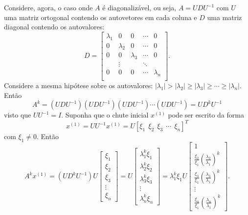 Considere, agora, o caso onde $A$ é diagonalizável, ou seja, $A=U D U^{-1}$ com $U$ uma matriz ortogonal contendo os autovetores em cada coluna e $D$ uma matriz diagonal contendo os autovalores:
\begin{equation*}
  D=\begin{bmatrix}
      \lambda_1&0&0&\cdots&0\\
      0&\lambda_2&0&\cdots&0\\
      0&  0&\lambda_3&\cdots&0\\
      &\vdots& &\ddots&\\
      0&  0&0&\cdots&\lambda_n\\
    \end{bmatrix}.
\end{equation*}
Considere a mesma hipótese sobre os autovalores: $|\lambda_1|>|\lambda_2|\geq |\lambda_3|\geq \cdots\geq |\lambda_n|$. Então
\begin{equation*}
  A^k=(U D U^{-1})(U D U^{-1})(U D U^{-1})\cdots (U D U^{-1})=UD^kU^ {-1}
\end{equation*}
visto que $UU^{-1} = I$. Suponha que o chute inicial $x^{(1)}$ pode ser escrito da forma
\begin{equation*}
  x^{(1)} = UU^ {-1}x^{(1)} = U[\xi_1\ \ \xi_2\ \ \xi_3\ \ \cdots \ \ \xi_n]^T
\end{equation*}
com $\xi_1\neq 0$. Então
\begin{equation*}
  A^kx^{(1)} = (UD^kU^{-1})U\begin{bmatrix} \xi_1\\ \xi_2\\ \xi_3\\ \vdots \\ \xi_n\end{bmatrix} = U\begin{bmatrix}\lambda_1^k\xi_1\\ \lambda_2^k\xi_2\\ \lambda_3^k\xi_3\\ \vdots \\ \lambda_n^k\xi_n\end{bmatrix} = \lambda_1^k\xi_1U\begin{bmatrix} 1\\ \frac{\xi_2}{\xi_1}\left(\frac{\lambda_2}{\lambda_1}\right)^k\\ \frac{\xi_3}{\xi_1}\left(\frac{\lambda_3}{\lambda_1}\right)^k\\ \vdots \\ \frac{\xi_n}{\xi_1}\left(\frac{\lambda_n}{\lambda_1}\right)^k\end{bmatrix}.
\end{equation*}
